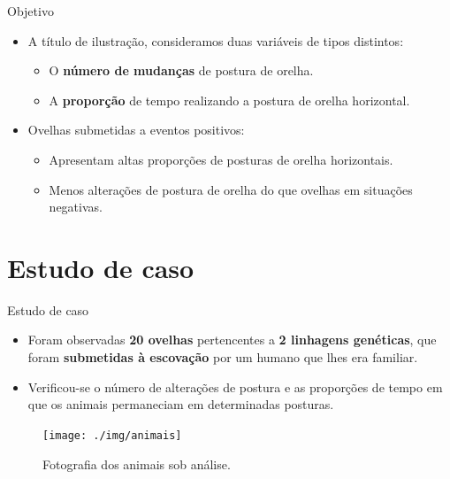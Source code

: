 \documentclass[
  ignorenonframetext,
  serif,
  professionalfont,
  usenames,
  dvipsnames,
  aspectratio = 169]{beamer}
\providecommand{\tightlist}{%
  \setlength{\itemsep}{0pt}\setlength{\parskip}{0pt}}
\renewcommand{\tightlist}{%
  \setlength{\itemsep}{0\baselineskip}
  \setlength{\parskip}{0.25\baselineskip}
}
\def\beginAHalfColumn{\begin{minipage}{0.49\textwidth}}%
\def\endColumns{\end{minipage}}%
\begin{document}
\begin{frame}{Objetivo}
\protect\hypertarget{objetivo-2}{}
\beginAHalfColumn

\begin{itemize}
\tightlist
\item
  A título de ilustração, consideramos duas variáveis de tipos
  distintos:

  \begin{itemize}
  \tightlist
  \item
    O \textbf{número de mudanças} de postura de orelha.
  \item
    A \textbf{proporção} de tempo realizando a postura de orelha
    horizontal.
  \end{itemize}
\end{itemize}

\endColumns
\beginAHalfColumn

\begin{itemize}
\tightlist
\item
  Ovelhas submetidas a eventos positivos:

  \begin{itemize}
  \tightlist
  \item
    Apresentam altas proporções de posturas de orelha horizontais.
  \item
    Menos alterações de postura de orelha do que ovelhas em situações
    negativas.
  \end{itemize}
\end{itemize}

\endColumns
\end{frame}

\hypertarget{estudo-de-caso}{%
\section{Estudo de caso}\label{estudo-de-caso}}

\begin{frame}{Estudo de caso}
\protect\hypertarget{estudo-de-caso-1}{}
\beginAHalfColumn

\begin{itemize}
\item
  Foram observadas \textbf{20 ovelhas} pertencentes a
  \textbf{2 linhagens genéticas}, que foram
  \textbf{submetidas à escovação} por um humano que lhes era familiar.
\item
  Verificou-se o número de alterações de postura e as proporções de
  tempo em que os animais permaneciam em determinadas posturas.
\end{itemize}

\endColumns
\beginAHalfColumn

\begin{figure}

{\centering \texttt{[image: ./img/animais]} 

}

\caption{Fotografia dos animais sob análise.}\label{fig:unnamed-chunk-3}
\end{figure}

\endColumns
\end{frame}
\end{document}
